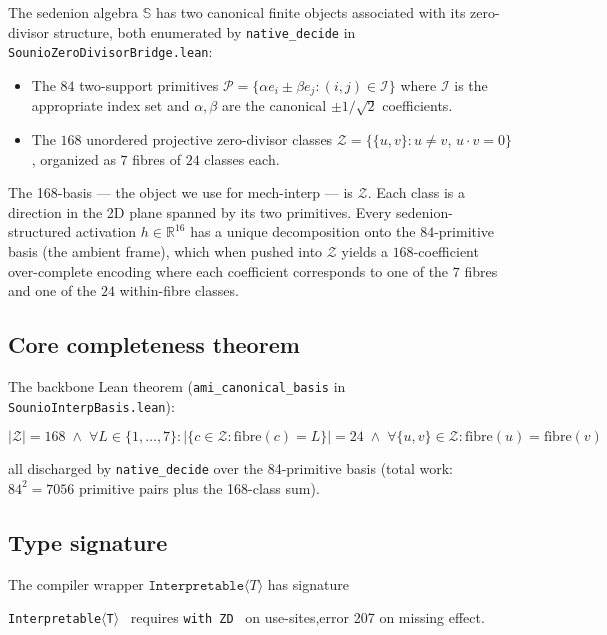 \documentclass{article}
\newcommand{\sio}{\mathbb{S}}
\newcommand{\Interpretable}[1]{\texttt{Interpretable}\langle #1 \rangle}
\newcommand{\withZD}{\texttt{with ZD}}
\begin{document}
The sedenion algebra $\sio$ has two canonical finite objects associated
with its zero-divisor structure, both enumerated by
\texttt{native\_decide} in \texttt{SounioZeroDivisorBridge.lean}:

\begin{itemize}
\item The $84$ two-support primitives $\mathcal{P} = \{\alpha e_i \pm \beta
      e_j : (i,j) \in \mathcal{I}\}$ where $\mathcal{I}$ is the
      appropriate index set and $\alpha, \beta$ are the canonical
      $\pm 1/\sqrt{2}$ coefficients.
\item The $168$ unordered projective zero-divisor classes
      $\mathcal{Z} = \{\{u, v\} : u \neq v,\,u \cdot v = 0\}$, organized
      as $7$ fibres of $24$ classes each.
\end{itemize}

The 168-basis --- the object we use for mech-interp --- is $\mathcal{Z}$.
Each class is a direction in the 2D plane spanned by its two primitives.
Every sedenion-structured activation $h \in \mathbb{R}^{16}$ has a
unique decomposition onto the $84$-primitive basis (the ambient frame),
which when pushed into $\mathcal{Z}$ yields a $168$-coefficient
over-complete encoding where each coefficient corresponds to one of
the $7$ fibres and one of the $24$ within-fibre classes.

\subsection{Core completeness theorem}

The backbone Lean theorem (\texttt{ami\_canonical\_basis} in
\texttt{SounioInterpBasis.lean}):

\begin{equation}
  |\mathcal{Z}| = 168 \;\land\;
  \forall L \in \{1,\dots,7\} : |\{c \in \mathcal{Z} : \mathrm{fibre}(c) = L\}| = 24 \;\land\;
  \forall \{u,v\} \in \mathcal{Z} : \mathrm{fibre}(u) = \mathrm{fibre}(v)
\end{equation}

all discharged by \texttt{native\_decide} over the 84-primitive basis
(total work: $84^2 = 7056$ primitive pairs plus the 168-class sum).

\subsection{Type signature}

The compiler wrapper $\Interpretable{T}$ has signature
\begin{center}
\texttt{Interpretable}$\langle$\texttt{T}$\rangle$ \ requires \withZD{} \ on use-sites,\quad error 207 on missing effect.
\end{center}
\end{document}
